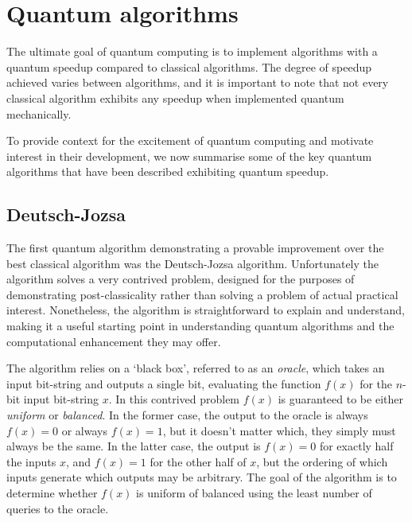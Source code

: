 %
%

\section{Quantum algorithms} \label{sec:quantum_algs}

The ultimate goal of quantum computing is to implement algorithms with a quantum speedup compared to classical algorithms. The degree of speedup achieved varies between algorithms, and it is important to note that not every classical algorithm exhibits any speedup when implemented quantum mechanically.

To provide context for the excitement of quantum computing and motivate interest in their development, we now summarise some of the key quantum algorithms that have been described exhibiting quantum speedup.



%
%

\subsection{Deutsch-Jozsa} 

The first quantum algorithm demonstrating a provable improvement over the best classical algorithm was the Deutsch-Jozsa algorithm\cite{bib:DeutschJozsa92}. Unfortunately the algorithm solves a very contrived problem, designed for the purposes of demonstrating post-classicality rather than solving a problem of actual practical interest. Nonetheless, the algorithm is straightforward to explain and understand, making it a useful starting point in understanding quantum algorithms and the computational enhancement they may offer.

The algorithm relies on a `black box', referred to as an \textit{oracle}, which takes an input bit-string and outputs a single bit, evaluating the function $f(x)$ for the $n$-bit input bit-string $x$. In this contrived problem $f(x)$ is guaranteed to be either \textit{uniform} or \textit{balanced}. In the former case, the output to the oracle is always \mbox{$f(x)=0$} or always \mbox{$f(x)=1$}, but it doesn't matter which, they simply must always be the same. In the latter case, the output is \mbox{$f(x)=0$} for exactly half the inputs $x$, and \mbox{$f(x)=1$} for the other half of $x$, but the ordering of which inputs generate which outputs may be arbitrary. The goal of the algorithm is to determine whether $f(x)$ is uniform of balanced using the least number of queries to the oracle.

